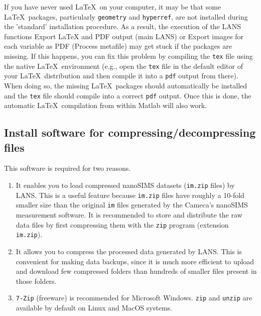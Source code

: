 \documentclass[a4paper, 11pt]{article}
\newcommand{\ttt}[1]{\texttt{#1}}
\newcommand{\lans}[1]{{\color{magenta}#1}}
\newcommand\mnote{\marginnote{\fbox{\textbf{\bf Note}}}}
\begin{document}
\mnote
If you have never used \LaTeX\ on your computer, it may be that some \LaTeX\ packages, parti\-cu\-larly \ttt{geometry} and \ttt{hyperref}, are not installed during the 'standard' installation procedure. As a result, the execution of the LANS functions \lans{Export LaTeX and PDF output} (main LANS) or \lans{Export images for each variable as PDF} (Process metafile) may get stuck if the packages are missing. If this happens, you can fix this problem by compiling the \ttt{tex} file using the native \LaTeX\ environment (e.g., open the \ttt{tex} file in the default editor of your \LaTeX\ distribution and then compile it into a \ttt{pdf} output from there). When doing so, the missing \LaTeX\ packages should automatically be installed and the \ttt{tex} file should compile into a correct \ttt{pdf} output. Once this is done, the automatic \LaTeX\ compilation from within Matlab will also work.


\subsection{Install software for compressing/decompressing files}

This software is required for two reasons.

\begin{enumerate}
 
\item It enables you to load compressed nanoSIMS datasets (\ttt{im.zip} files) by LANS. This is a useful feature because \ttt{im.zip} files have roughly a 10-fold smaller size than the original \ttt{im} files generated by the Cameca's nanoSIMS measurement software. It is recommended to store and distribute the raw data files by first compressing them with the \ttt{zip} program (extension \ttt{im.zip}). 

\item It allows you to compress the processed data generated by LANS. This is convenient for making data backups, since it is much more efficient to upload and download few compressed folders than hundreds of smaller files present in those folders.

\item \ttt{7-Zip} (freeware) is recommended for Microsoft Windows. \ttt{zip} and \ttt{unzip} are available by default on Linux and MacOS systems.

\end{enumerate}

\end{document}
